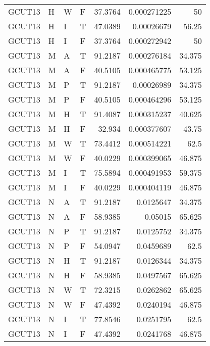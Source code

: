 \begin{table}[!htb]
{\begin{tabular}{llllrrr}
            GCUT13   & H     & W     & F          & 37.3764    & 0.000271225 & 50       \\
            GCUT13   & H     & I     & T          & 47.0389    & 0.00026679  & 56.25    \\
            GCUT13   & H     & I     & F          & 37.3764    & 0.000272942 & 50       \\
            GCUT13   & M     & A     & T          & 91.2187    & 0.000276184 & 34.375   \\
            GCUT13   & M     & A     & F          & 40.5105    & 0.000465775 & 53.125   \\
            GCUT13   & M     & P     & T          & 91.2187    & 0.00026989  & 34.375   \\
            GCUT13   & M     & P     & F          & 40.5105    & 0.000464296 & 53.125   \\
            GCUT13   & M     & H     & T          & 91.4087    & 0.000315237 & 40.625   \\
            GCUT13   & M     & H     & F          & 32.934     & 0.000377607 & 43.75    \\
            GCUT13   & M     & W     & T          & 73.4412    & 0.000514221 & 62.5     \\
            GCUT13   & M     & W     & F          & 40.0229    & 0.000399065 & 46.875   \\
            GCUT13   & M     & I     & T          & 75.5894    & 0.000491953 & 59.375   \\
            GCUT13   & M     & I     & F          & 40.0229    & 0.000404119 & 46.875   \\
            GCUT13   & N     & A     & T          & 91.2187    & 0.0125647   & 34.375   \\
            GCUT13   & N     & A     & F          & 58.9385    & 0.05015     & 65.625   \\
            GCUT13   & N     & P     & T          & 91.2187    & 0.0125752   & 34.375   \\
            GCUT13   & N     & P     & F          & 54.0947    & 0.0459689   & 62.5     \\
            GCUT13   & N     & H     & T          & 91.2187    & 0.0126344   & 34.375   \\
            GCUT13   & N     & H     & F          & 58.9385    & 0.0497567   & 65.625   \\
            GCUT13   & N     & W     & T          & 72.3215    & 0.0262862   & 65.625   \\
            GCUT13   & N     & W     & F          & 47.4392    & 0.0240194   & 46.875   \\
            GCUT13   & N     & I     & T          & 77.8546    & 0.0251795   & 62.5     \\
            GCUT13   & N     & I     & F          & 47.4392    & 0.0241768   & 46.875   \\
            \hline
        \end{tabular}
    }{}
\end{table}